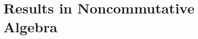


\chapter{Results in Noncommutative
  Algebra}\label{sec:results-noncommutative-algebra}




 




